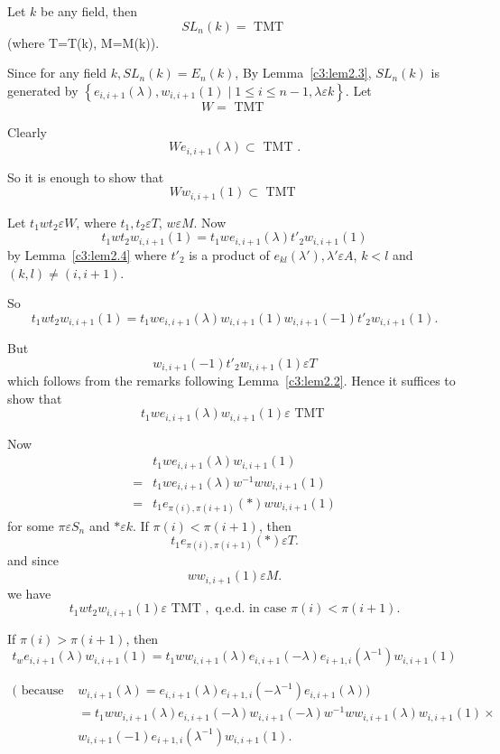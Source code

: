 \begin{thm}\label{c3:thm2.5}
Let $k$ be any field, then 
$$
SL_n(k)=\text{ TMT }
$$
(where T=T(k), M=M(k)).
\end{thm}

\begin{Proof}
Since for any field $k, SL_n(k)=E_n(k)$, By Lemma~\ref{c3:lem2.3},
$SL_n(k)$ is generated by $\left\{e_{i,i+1}(\lambda),w_{i,i+1}(1)\mid
1\leq i \leq n-1,\lambda \varepsilon k\right\}$. Let 
$$
W=\text{ TMT }
$$

Clearly
$$
We_{i,i+1}(\lambda)\subset \text{ TMT }.
$$

So it is enough to show that 
$$
Ww_{i,i+1}(1)\subset \text{ TMT }
$$

Let $t_1wt_2\varepsilon W$, where $t_1,t_2\varepsilon T$, $
w\varepsilon M$. Now 
$$
t_1wt_{2}w_{i,i+1}(1)=t_1we_{i,i+1}(\lambda) t'_2w_{i,i+1}(1)
$$
by Lemma~\ref{c3:lem2.4} where $t'_2$ is a product of
$e_{kl}(\lambda'),\lambda' \varepsilon A$, $k < l$ and $(k,l)\neq (i,
i+1)$.

So
$$
t_1wt_2w_{i,i+1}(1)=t_1we_{i,i+1}(\lambda)w_{i,i+1}(1)w_{i,i+1}(-1)t'_2w_{i,i+1}(1).
$$

But
$$
w_{i,i+1}(-1)t'_2w_{i,i+1}(1)\varepsilon T
$$
which follows from the remarks following Lemma~\ref{c3:lem2.2}. Hence
it suffices to show that 
$$
t_1we_{i,i+1}(\lambda)w_{i,i+1}(1)\varepsilon \text{ TMT }
$$

Now
\begin{align*}
&t_1we_{i,i+1}(\lambda)w_{i,i+1}(1)\\
=& t_1we_{i,i+1}(\lambda) w^{-1}ww_{i,i+1}(1)\\
=& t_1e_{\pi(i),\pi(i+1)}(\ast)ww_{i,i+1}(1)
\end{align*}
for some $\pi \varepsilon S_n$ and $\ast \varepsilon k$. If
$\pi(i)<\pi(i+1)$, then 
$$
t_1e_{\pi(i),\pi(i+1)}(\ast) \varepsilon T.
$$
and since 
$$
ww_{i,i+1}(1)\varepsilon M.
$$
we have
$$
t_1wt_{2}w_{i,i+1}(1)\varepsilon \text{ TMT }, \text{ q.e.d. in case } \pi(i)<\pi(i+1).
$$

If $\pi(i)>\pi(i+1)$, then 
$$
t_we_{i,i+1}(\lambda)w_{i,i+1}(1)=t_1ww_{i,i+1}(\lambda)e_{i,i+1}(-\lambda)e_{i+1,i}\left(\lambda^{-1}\right)w_{i,i+1}(1)
$$

$$
\begin{aligned}
(\text{ because } &w_{i,i+1}(\lambda)=e_{i,i+1}(\lambda)e_{i+1,i}\left(-\lambda^{-1}\right)e_{i,i+1}(\lambda))\\
&{}=t_{1}ww_{i,i+1}(\lambda)e_{i,i+1}(-\lambda)
  w_{i,i+1}(-\lambda)w^{-1}ww_{i,i+1}(\lambda)w_{i,i+1}(1)\times\\
&{} w_{i,i+1}(-1)e_{i+1,i}\left(\lambda^{-1}\right)w_{i,i+1}(1).
\end{aligned}
$$


\end{Proof}
